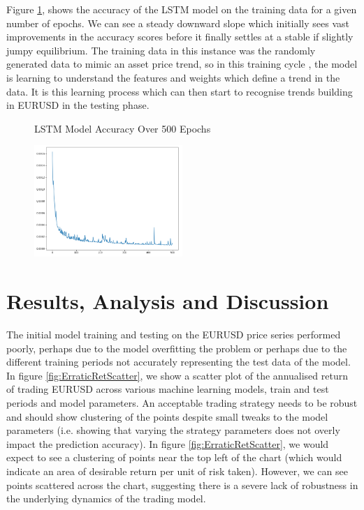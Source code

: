 \documentclass[11pt]{article}
\begin{document}
Figure \ref{fig:500EPOCHTraining_accuracy}, shows the accuracy of the LSTM model on the training data for a given number of epochs. We can see a steady downward slope which initially sees vast improvements in the accuracy scores before it finally settles at a stable if slightly jumpy equilibrium. The training data in this instance was the randomly generated data to mimic an asset price trend, so in this training cycle , the model is learning to understand the features and weights which define a trend in the data. It is this learning process which can then start to recognise trends building in EURUSD in the testing phase.
\begin{figure}[h]
    \centering
	\caption{LSTM Model Accuracy Over 500 Epochs}    
	\includegraphics[width=0.5\textwidth]{500EPOCHTraining_accuracy}
    \label{fig:500EPOCHTraining_accuracy}
     \caption*{}
\end{figure}


\clearpage

\section{Results, Analysis and Discussion}  \label{results}

The initial model training and testing on the EURUSD price series performed poorly, perhaps due to the model overfitting the problem or perhaps due to the different training periods not accurately representing the test data of the model.
In figure \ref{fig:ErraticRetScatter}, we show a scatter plot of the annualised return of trading EURUSD across various machine learning models, train and test periods and model parameters. An acceptable trading strategy needs to be robust and should show clustering of the points despite small tweaks to the model parameters (i.e. showing that varying the strategy parameters does not overly impact the prediction accuracy). In figure \ref{fig:ErraticRetScatter}, we would expect to see a clustering of points near the top left of the chart (which would indicate an area of desirable return per unit of risk taken).  However, we can see points scattered across the chart, suggesting there is a severe lack of robustness in the underlying dynamics of the trading model.
\end{document}
